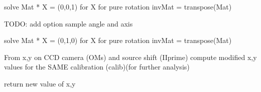 \documentclass[letterpaper,10pt,english]{sphinxmanual}
\begin{document}

\begin{fulllineitems}
\label{\detokenize{Simulation_Module:LaueTools.LaueGeometry.vec_normalTosurface}}
solve Mat * X = (0,0,1) for X
for pure rotation invMat = transpose(Mat)

TODO: add option sample angle and axis

\end{fulllineitems}


\begin{fulllineitems}
\label{\detokenize{Simulation_Module:LaueTools.LaueGeometry.vec_onsurface_alongys}}
solve Mat * X = (0,1,0) for X
for pure rotation invMat = transpose(Mat)

\end{fulllineitems}


\begin{fulllineitems}
\label{\detokenize{Simulation_Module:LaueTools.LaueGeometry.convert_xycam_from_sourceshift}}
From x,y on CCD camera (OMs) and source shift (IIprime)
compute modified x,y values for the SAME calibration (calib)(for further analysis)

return new value of x,y

\end{fulllineitems}

\end{document}
